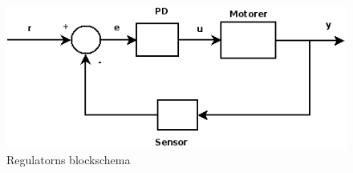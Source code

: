 \begin{figure}[H]
  \centering
  \includegraphics[scale=0.7]{bilder/regulator.png}
  \caption{Regulatorns blockschema}
  \label{fig:regulator}
\end{figure}

